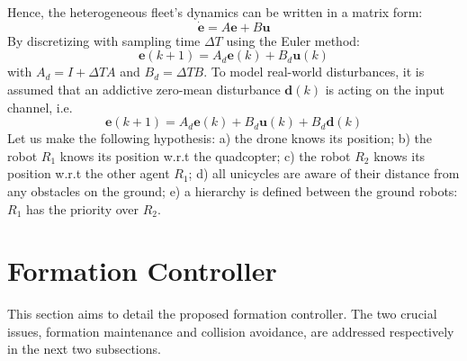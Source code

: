 \documentclass{ifacconf}
\begin{document}
Hence, the heterogeneous fleet's dynamics can be written in a matrix form:
\begin{equation}
    \dot{\boldsymbol{e}} = A \boldsymbol{e} + B \boldsymbol{u}
\end{equation}
By discretizing with sampling time $\Delta T$ using the Euler method:
\begin{equation}
    \boldsymbol{e}(k+1) = A_d \boldsymbol{e}(k) + B_d \boldsymbol{u}(k) 
    \label{eq:airground-fleet-z}
\end{equation}
with $A_d = I + \Delta T A $ and $B_d = \Delta T B$.
To model real-world disturbances, it is assumed 
that an addictive zero-mean disturbance $\boldsymbol{d}(k)$
is acting on the input channel, i.e.
\begin{equation}
    \boldsymbol{e}(k+1) = A_d \boldsymbol{e}(k) + B_d \boldsymbol{u}(k) + B_d \boldsymbol{d}(k)
    \label{eq:airground-fleet-z}
\end{equation}
Let us make the following hypothesis: 
a) the drone knows its position;
b) the robot $R_1$ knows its position w.r.t the quadcopter;
c) the robot $R_2$ knows its position w.r.t the other agent $R_1$;
d) all unicycles are aware of their distance from any obstacles on the ground;
e) a hierarchy is defined between the ground robots: $R_1$ has the priority over $R_2$.
\section{Formation Controller}
\label{sec:formation_controller}

This section aims to detail the proposed formation controller.
The two crucial issues, formation maintenance and collision avoidance, 
are addressed respectively in the next two subsections.
\end{document}
